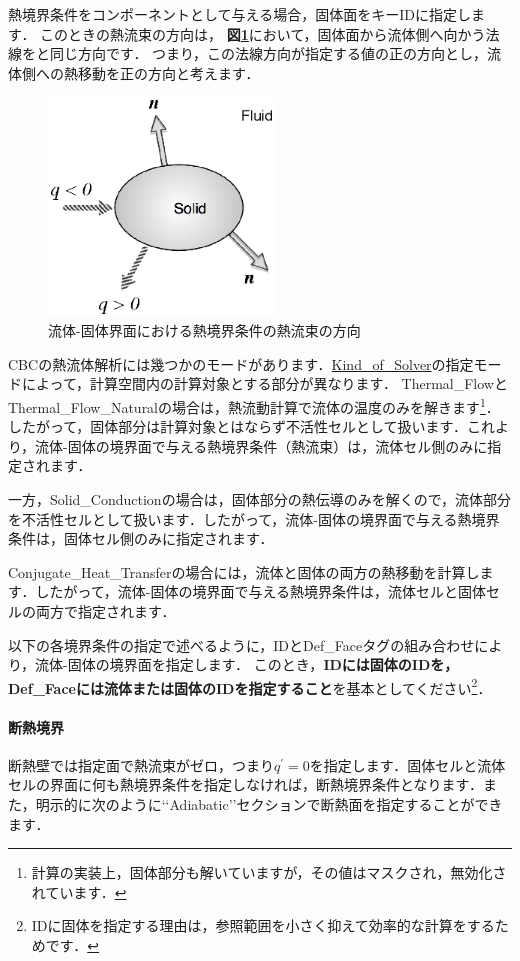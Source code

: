 熱境界条件をコンポーネントとして与える場合，固体面をキーIDに指定します．
このときの熱流束の方向は，
\textbf{図\ref{fig:heat bc on solid}}において，固体面から流体側へ向かう法線をと同じ方向です．
つまり，この法線方向が指定する値の正の方向とし，流体側への熱移動を正の方向と考えます．

\begin{figure}[htbp]
\begin{center}
\includegraphics[width=6cm,clip]{heatBC.eps}
\end{center}
\caption{流体-固体界面における熱境界条件の熱流束の方向}
\label{fig:heat bc on solid}
\end{figure}

CBCの熱流体解析には幾つかのモードがあります．\hyperlink{tgt:solver_property}{Kind\_of\_Solver}の指定モードによって，計算空間内の計算対象とする部分が異なります．
Thermal\_FlowとThermal\_Flow\_Naturalの場合は，熱流動計算で流体の温度のみを解きます\footnote{計算の実装上，固体部分も解いていますが，その値はマスクされ，無効化されています．}．したがって，固体部分は計算対象とはならず不活性セルとして扱います．これより，流体-固体の境界面で与える熱境界条件（熱流束）は，流体セル側のみに指定されます．

一方，Solid\_Conductionの場合は，固体部分の熱伝導のみを解くので，流体部分を不活性セルとして扱います．したがって，流体-固体の境界面で与える熱境界条件は，固体セル側のみに指定されます．

Conjugate\_Heat\_Transferの場合には，流体と固体の両方の熱移動を計算します．したがって，流体-固体の境界面で与える熱境界条件は，流体セルと固体セルの両方で指定されます．

以下の各境界条件の指定で述べるように，IDとDef\_Faceタグの組み合わせにより，流体-固体の境界面を指定します．
このとき，\textbf{IDには固体のIDを，Def\_Faceには流体または固体のIDを指定すること}を基本としてください\footnote{IDに固体を指定する理由は，参照範囲を小さく抑えて効率的な計算をするためです．}．

%
\paragraph{断熱境界}
断熱壁では指定面で熱流束がゼロ，つまり$q^{\prime}=0$を指定します．固体セルと流体セルの界面に何も熱境界条件を指定しなければ，断熱境界条件となります．また，明示的に次のように\lq\lq Adiabatic\rq\rq セクションで断熱面を指定することができます．

